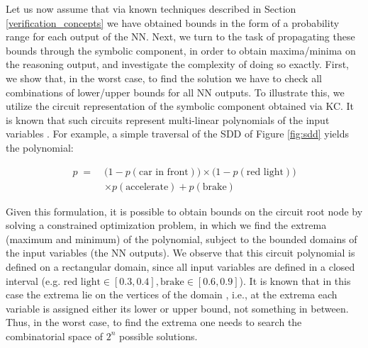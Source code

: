 



Let us now assume that via known techniques described in Section \ref{verification_concepts} we have obtained bounds in the form of a probability range for each output of the NN. Next, we turn to the task of propagating these bounds through the symbolic component, in order to obtain maxima/minima on the reasoning output, and investigate the complexity of doing so exactly. First, we show that, in the worst case, to find the solution we have to check all combinations of lower/upper bounds for all NN outputs. To illustrate this, we utilize the circuit representation of the symbolic component obtained via KC. It is known that such circuits represent multi-linear polynomials of the input variables \cite{choi2020probabilistic}. For example, a simple traversal of the SDD of Figure \ref{fig:sdd} yields the polynomial:

\vspace{-0.3cm}
\begin{align*}
    p \; = \; &\big( 1 - p(\text{car in front}) \big) \times \big( 1 - p(\text{red light}) \big) \\
    &\times p(\text{accelerate}) + p(\text{brake})
\end{align*}

Given this formulation, it is possible to obtain bounds on the circuit root node by solving a constrained optimization problem, in which we find the extrema (maximum and minimum) of the polynomial, subject to the bounded domains of the input variables (the NN outputs). We observe that this circuit polynomial is defined on a rectangular domain, since all input variables are defined in a closed interval (e.g. $\text{red light} \in [0.3, 0.4], \text{brake} \in [0.6, 0.9]$). It is known that in this case the extrema lie on the vertices of the domain \cite{laneve2010interval}, i.e., at the extrema each variable is assigned either its lower or upper bound, not something in between. Thus, in the worst case, to find the extrema one needs to search the combinatorial space of $2^n$ possible solutions.

